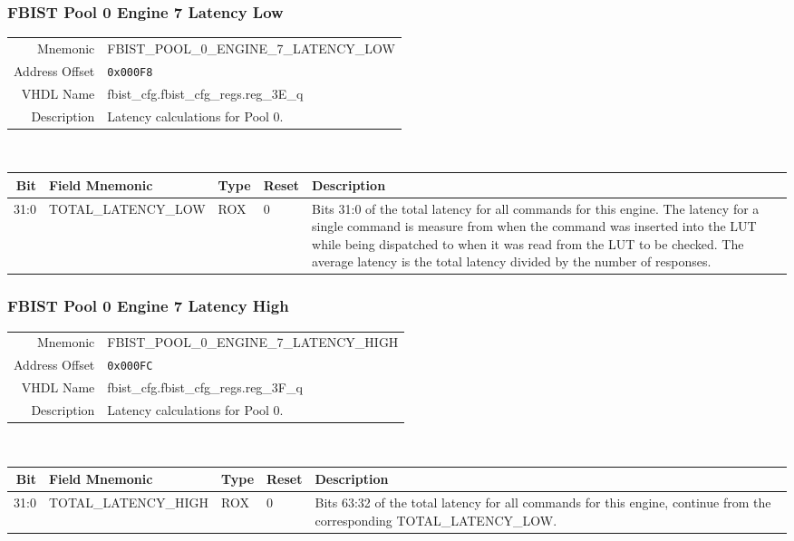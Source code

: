 \subsubsection{FBIST Pool 0 Engine 7 Latency Low}
\begin{tabular}{ r | p{350px} }
  Mnemonic       & FBIST\_POOL\_0\_ENGINE\_7\_LATENCY\_LOW \\
  Address Offset & \texttt{0x000F8}                        \\
  VHDL Name      &  fbist\_cfg.fbist\_cfg\_regs.reg\_3E\_q \\ \hline

  Description &
  Latency calculations for Pool 0. \\
\end{tabular}
\\
\begin{tabularx}{\textwidth}{r|l|l|l|X}
  \hline
  Bit   & Field Mnemonic      & Type & Reset & Description \\ \hline

  31:0  & TOTAL\_LATENCY\_LOW & ROX  & 0     &

  Bits 31:0 of the total latency for all commands for this engine. The
  latency for a single command is measure from when the command was
  inserted into the LUT while being dispatched to when it was read
  from the LUT to be checked. The average latency is the total latency
  divided by the number of responses. \\
\end{tabularx}

\subsubsection{FBIST Pool 0 Engine 7 Latency High}
\begin{tabular}{ r | p{350px} }
  Mnemonic       & FBIST\_POOL\_0\_ENGINE\_7\_LATENCY\_HIGH \\
  Address Offset & \texttt{0x000FC}                         \\
  VHDL Name      &  fbist\_cfg.fbist\_cfg\_regs.reg\_3F\_q  \\ \hline

  Description &
  Latency calculations for Pool 0. \\
\end{tabular}
\\
\begin{tabularx}{\textwidth}{r|l|l|l|X}
  \hline
  Bit   & Field Mnemonic       & Type & Reset & Description \\ \hline

  31:0  & TOTAL\_LATENCY\_HIGH & ROX  & 0     &

  Bits 63:32 of the total latency for all commands for this engine,
  continue from the corresponding TOTAL\_LATENCY\_LOW. \\
\end{tabularx}

